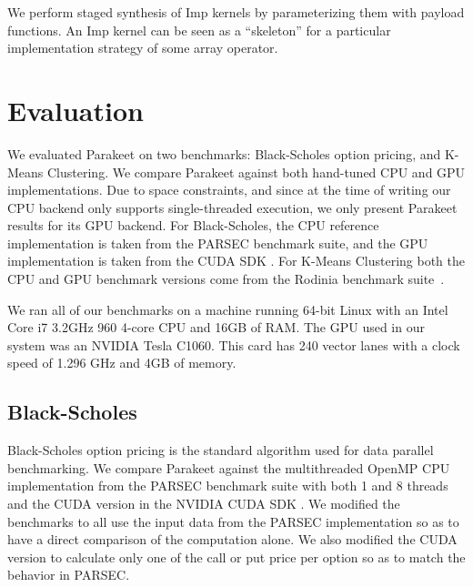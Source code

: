 \documentclass[10pt,twocolumn]{article}
\begin{document}
We perform staged synthesis of Imp kernels by parameterizing them with payload functions. An Imp kernel can be seen as a ``skeleton'' \cite{Cole04} for a particular implementation strategy of some array operator.  

\section{Evaluation}
\label{Evaluation}

We evaluated Parakeet on two benchmarks: Black-Scholes option pricing, and K-Means Clustering.  We compare Parakeet against both hand-tuned CPU and GPU implementations.  Due to space constraints, and since at the time of writing our CPU backend only supports single-threaded execution, we only present Parakeet results for its GPU backend.  For Black-Scholes, the CPU reference implementation is taken from the PARSEC \cite{Bien08} benchmark suite, and the GPU implementation is taken from the CUDA SDK \cite{NvidSD}.  For K-Means Clustering both the CPU and GPU benchmark versions come from the Rodinia benchmark suite~\cite{Che09}.

We ran all of our benchmarks on a machine running 64-bit Linux with an Intel Core i7 3.2GHz 960 4-core CPU  and 16GB of RAM.  The GPU used in our system was an NVIDIA Tesla C1060. This card has 240 vector lanes with a clock speed of 1.296 GHz and 4GB of memory.

\subsection{Black-Scholes}
\label{results-bs}

Black-Scholes option pricing \cite{Blac73} is the standard algorithm used for data parallel benchmarking.  We compare Parakeet against the multithreaded OpenMP CPU implementation from the PARSEC \cite{Bien08} benchmark suite with both 1 and 8 threads and the CUDA version in the NVIDIA CUDA SDK \cite{NvidSD}.  We modified the benchmarks to all use the input data from the PARSEC implementation so as to have a direct comparison of the computation alone.  We also modified the CUDA version to calculate only one of the call or put price per option so as to match the behavior in PARSEC.
\end{document}

